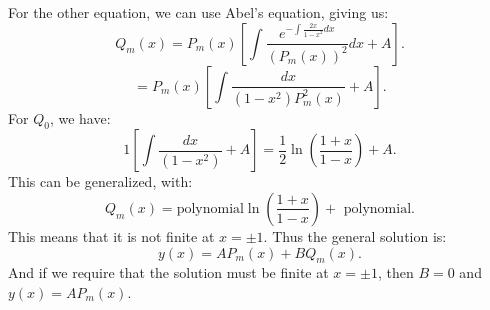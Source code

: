 \documentclass[../main/main.tex]{subfiles}
\begin{document}
For the other equation, we can use Abel's equation, giving us: \[
	Q_m(x) = P_m(x) \left[ \int \frac{e^{-\int \frac{2x}{1-x^2}dx}}{(P_m(x))^2}dx + A \right] 
.\] \[
= P_m(x) \left[ \int \frac{dx}{(1-x^2)P^2_m(x)}+A \right] 
.\] For $Q_0$, we have:  \[
1\left[ \int \frac{dx}{(1-x^2)}+A \right] = \frac{1}{2}\ln\left( \frac{1+x}{1-x} \right) +A
.\] This can be generalized, with: \[
Q_m(x) = \text{polynomial}\ln\left( \frac{1+x}{1-x} \right) + \text{ polynomial}
.\] This means that it is not finite at $x=\pm 1$. Thus the general solution is: \[
y(x) = AP_m(x) +BQ_m(x)
.\] And if we require that the solution must be finite at $x=\pm 1$, then $B=0$ and $y(x)=AP_m(x)$.
\end{document}
